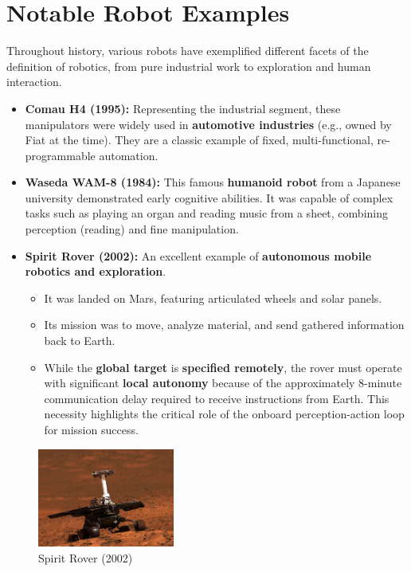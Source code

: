 \documentclass[10pt, letterpaper]{report}
\begin{document}
\section{Notable Robot Examples}\label{gemini:examples}
Throughout history, various robots have exemplified different facets of the definition of robotics, from pure industrial work to exploration and human interaction.

\begin{itemize}
    \item \textbf{Comau H4 (1995):} Representing the industrial segment, these manipulators were widely used in \textbf{automotive industries} (e.g., owned by Fiat at the time). They are a classic example of fixed, multi-functional, re-programmable automation.
    
    \item \textbf{Waseda WAM-8 (1984):} This famous \textbf{humanoid robot} from a Japanese university demonstrated early cognitive abilities. It was capable of complex tasks such as playing an organ and reading music from a sheet, combining perception (reading) and fine manipulation.
    
    \item \textbf{Spirit Rover (2002):} An excellent example of \textbf{autonomous mobile robotics and exploration}.
    \begin{itemize}
        \item It was landed on Mars, featuring articulated wheels and solar panels.
        \item Its mission was to move, analyze material, and send gathered information back to Earth.
        \item While the \textbf{global target} is \textbf{specified remotely}, the rover must operate with significant \textbf{local autonomy} because of the approximately 8-minute communication delay required to receive instructions from Earth. This necessity highlights the critical role of the onboard perception-action loop for mission success.
    \end{itemize}
\end{itemize}
\begin{figure}[h!]
    \centering
    \includegraphics[width=0.4\textwidth ]{images/rover.jpg} 
    \caption{Spirit Rover (2002)}
\end{figure}
\end{document}
